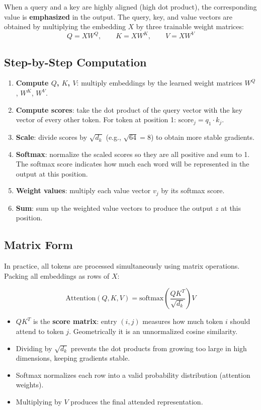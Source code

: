 \documentclass[11pt,a4paper]{article}
\theoremstyle{definition}
\theoremstyle{plain}
\theoremstyle{remark}
\begin{document}
When a query and a key are highly aligned (high dot product), the corresponding value is \textbf{emphasized} in the output. The query, key, and value vectors are obtained by multiplying the embedding $X$ by three trainable weight matrices:
\[
    Q = X W^Q, \qquad K = X W^K, \qquad V = X W^V
\]

\subsection{Step-by-Step Computation}

\begin{enumerate}
    \item \textbf{Compute $Q$, $K$, $V$}: multiply embeddings by the learned weight matrices $W^Q$, $W^K$, $W^V$.
    \item \textbf{Compute scores}: take the dot product of the query vector with the key vector of every other token. For token at position 1: $\text{score}_j = q_1 \cdot k_j$.
    \item \textbf{Scale}: divide scores by $\sqrt{d_k}$ (e.g., $\sqrt{64} = 8$) to obtain more stable gradients.
    \item \textbf{Softmax}: normalize the scaled scores so they are all positive and sum to 1. The softmax score indicates how much each word will be represented in the output at this position.
    \item \textbf{Weight values}: multiply each value vector $v_j$ by its softmax score.
    \item \textbf{Sum}: sum up the weighted value vectors to produce the output $z$ at this position.
\end{enumerate}

\subsection{Matrix Form}

In practice, all tokens are processed simultaneously using matrix operations. Packing all embeddings as rows of $X$:

\[
    \boxed{\mathrm{Attention}(Q, K, V) = \mathrm{softmax}\!\left(\frac{Q K^T}{\sqrt{d_k}}\right) V}
\]

\begin{itemize}
    \item $QK^T$ is the \textbf{score matrix}: entry $(i,j)$ measures how much token $i$ should attend to token $j$. Geometrically it is an unnormalized cosine similarity.
    \item Dividing by $\sqrt{d_k}$ prevents the dot products from growing too large in high dimensions, keeping gradients stable.
    \item Softmax normalizes each row into a valid probability distribution (attention weights).
    \item Multiplying by $V$ produces the final attended representation.
\end{itemize}
\end{document}
